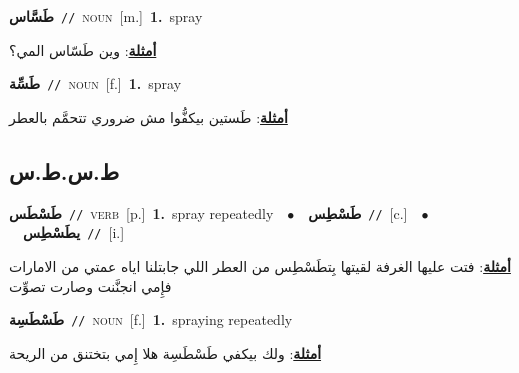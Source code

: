 \documentclass[10pt,a4paper,twoside]{article} %
\begin{document}
\begin{multicols}{2}
{\setlength\topsep{0pt}\textbf{\foreignlanguage{arabic}{طَسَّاس}}\ {\color{gray}\texttt{//}\color{black}}\ \textsc{noun}\ [m.]\ \textbf{1.}~spray\  \begin{flushright}\color{gray}\foreignlanguage{arabic}{\textbf{\underline{\foreignlanguage{arabic}{أمثلة}}}: وين طَسّاس المي؟}\end{flushright}\color{black}} \vspace{2mm}

{\setlength\topsep{0pt}\textbf{\foreignlanguage{arabic}{طَسِّة}}\ {\color{gray}\texttt{//}\color{black}}\ \textsc{noun}\ [f.]\ \textbf{1.}~spray\  \begin{flushright}\color{gray}\foreignlanguage{arabic}{\textbf{\underline{\foreignlanguage{arabic}{أمثلة}}}: طَستين بيكفُّوا مش ضروري تتحمَّم بالعطر}\end{flushright}\color{black}} \vspace{2mm}

\vspace{-3mm}
\subsection*{\color{blue}\foreignlanguage{arabic}{ط.س.ط.س}\color{blue}{}} 

{\setlength\topsep{0pt}\textbf{\foreignlanguage{arabic}{طَسْطَس}}\ {\color{gray}\texttt{//}\color{black}}\ \textsc{verb}\ [p.]\ \textbf{1.}~spray repeatedly\ \ $\bullet$\ \ \setlength\topsep{0pt}\textbf{\foreignlanguage{arabic}{طَسْطِس}}\ {\color{gray}\texttt{//}\color{black}}\ [c.]\ \ $\bullet$\ \ \setlength\topsep{0pt}\textbf{\foreignlanguage{arabic}{يطَسْطِس}}\ {\color{gray}\texttt{//}\color{black}}\ [i.]\  \begin{flushright}\color{gray}\foreignlanguage{arabic}{\textbf{\underline{\foreignlanguage{arabic}{أمثلة}}}: فتت عليها الغرفة لقيتها بِتطَسْطِس من العطر اللي جابتلنا اياه عمتي من الامارات فإِمي انجنَّنت وصارت تصوِّت}\end{flushright}\color{black}} \vspace{2mm}

{\setlength\topsep{0pt}\textbf{\foreignlanguage{arabic}{طَسْطَسِة}}\ {\color{gray}\texttt{//}\color{black}}\ \textsc{noun}\ [f.]\ \textbf{1.}~spraying repeatedly\  \begin{flushright}\color{gray}\foreignlanguage{arabic}{\textbf{\underline{\foreignlanguage{arabic}{أمثلة}}}: ولك بيكفي طَسْطَسِة هلا إِمي بتختنق من الريحة}\end{flushright}\color{black}} \vspace{2mm}


\end{multicols}
\end{document}
